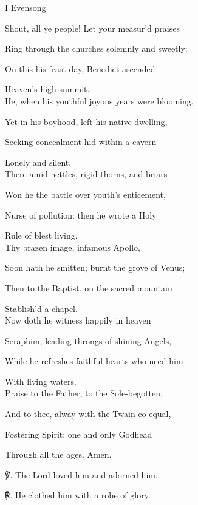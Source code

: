\begin{paracol}{2}[]
\sloppy
\begin{inhead}
	I Evensong
\end{inhead}
\begin{hangparas}{1.25em}{1}
Shout, all ye people! Let your measur'd praises

Ring through the churches solemnly and sweetly:

On this his feast day, Benedict ascended

Heaven's high summit.\\

He, when his youthful joyous years were blooming,

Yet in his boyhood, left his native dwelling,

Seeking concealment hid within a cavern

Lonely and silent.\\

There amid nettles, rigid thorns, and briars

Won he the battle over youth's enticement,

Nurse of pollution: then he wrote a Holy

Rule of blest living.\\

Thy brazen image, infamous Apollo,

Soon hath he smitten; burnt the grove of Venus;

Then to the Baptist, on the sacred mountain

Stablish'd a chapel.\\

Now doth he witness happily in heaven

Seraphim, leading throngs of shining Angels,

While he refreshes faithful hearts who need him

With living waters.\\

Praise to the Father, to the Sole-begotten,

And to thee, alway with the Twain co-equal,

Fostering Spirit; one and only Godhead

Through all the ages. Amen.\\
\end{hangparas}

    ℣. The Lord loved him and adorned him.

	℟. He clothed him with a robe of glory.
	

\end{paracol}
